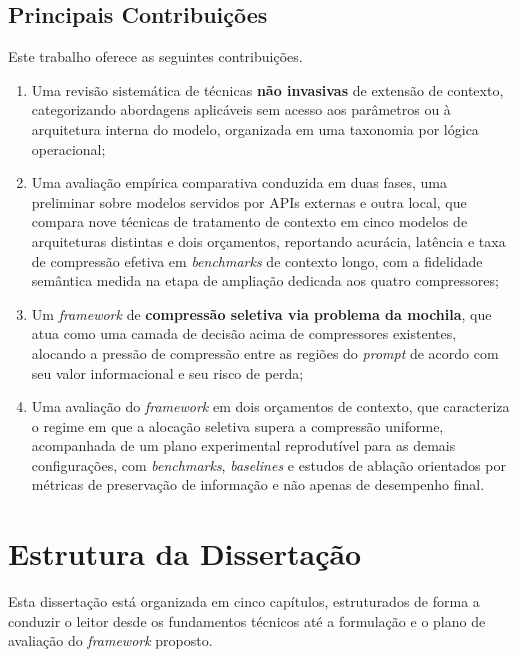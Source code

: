 \subsection{Principais Contribuições}
\label{subsec:contribuicoes}

Este trabalho oferece as seguintes contribuições.

\begin{enumerate}[leftmargin=1.8em]
\item Uma revisão sistemática de técnicas \textbf{não invasivas} de extensão de contexto, categorizando abordagens aplicáveis sem acesso aos parâmetros ou à arquitetura interna do modelo, organizada em uma taxonomia por lógica operacional;

\item Uma avaliação empírica comparativa conduzida em duas fases, uma preliminar sobre modelos servidos por APIs externas e outra local, que compara nove técnicas de tratamento de contexto em cinco modelos de arquiteturas distintas e dois orçamentos, reportando acurácia, latência e taxa de compressão efetiva em \textit{benchmarks} de contexto longo, com a fidelidade semântica medida na etapa de ampliação dedicada aos quatro compressores;

\item Um \textit{framework} de \textbf{compressão seletiva via problema da mochila}, que atua como uma camada de decisão acima de compressores existentes, alocando a pressão de compressão entre as regiões do \textit{prompt} de acordo com seu valor informacional e seu risco de perda;

\item Uma avaliação do \textit{framework} em dois orçamentos de contexto, que caracteriza o regime em que a alocação seletiva supera a compressão uniforme, acompanhada de um plano experimental reprodutível para as demais configurações, com \textit{benchmarks}, \textit{baselines} e estudos de ablação orientados por métricas de preservação de informação e não apenas de desempenho final.
\end{enumerate}

\section{Estrutura da Dissertação}
\label{sec:estrutura}

Esta dissertação está organizada em cinco capítulos, estruturados de forma a conduzir o leitor desde os fundamentos técnicos até a formulação e o plano de avaliação do \textit{framework} proposto.

